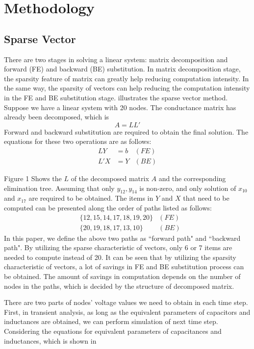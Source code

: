 \section{Methodology}
  \subsection{Sparse Vector}
    There are two stages in solving a linear system: matrix decomposition and forward (FE) and backward (BE) substitution. In matrix 
decomposition stage, the sparsity feature of matrix can greatly help reducing computation intensity. In the same way, the sparsity of 
vectors can help reducing the computation intensity in the FE and BE substitution stage. \cite{Tinney} illustrates the sparse vector 
method. Suppose we have a linear system with 20 nodes. The conductance matrix has already been decomposed, which is 
\begin{equation}
	A=LL'\label{eq3.1}
\end{equation}
Forward and backward substitution are required to obtain the final solution. The equations for these two operations are as follows:
\begin{align}
	LY &=b  &(FE)\label{eq3.2}\\
	L'X &= Y&(BE)\label{eq3.3}
\end{align}

Figure 1 Shows the $L$ of the decomposed matrix $A$ and the corresponding elimination tree. Assuming that only $y_{12}, y_{14}$ is 
non-zero, and only solution of $x_{10}$ and $x_{17}$ are required to be obtained. The items in $Y$ and $X$ that need to be computed can be 
presented along the order of paths listed as follows:
\begin{align}
&\{12, 15, 14, 17, 18, 19, 20\} &(FE)\label{eq3.4}\\
&\{20, 19, 18, 17, 13, 10\}&(BE)\label{eq3.5}
\end{align}
In this paper, we define the above two paths as ``forward path" and ``backward path". By utilizing the sparse characteristic of vectors,
only 6 or 7 items are needed to compute instead of 20. It can be seen that by utilizing the sparsity characteristic of vectors, a lot of
savings in FE and BE substitution process can be obtained. The amount of savings in computation depends on the number of nodes in the 
paths, which is decided by the structure of decomposed matrix. 
 
There are two parts of nodes' voltage values we need to obtain in each time step. First, in transient analysis, as long as the equivalent parameters of capacitors and inductances are obtained, we can perform 
simulation of next time step. Considering the equations for equivalent parameters of capacitances and inductances, which is shown in %

